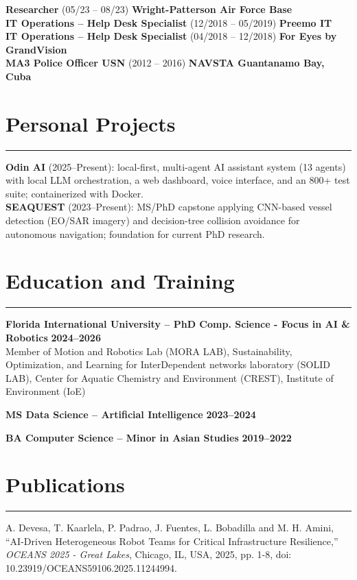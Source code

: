 \documentclass[10pt,letterpaper]{article}
\newcommand{\sectionrule}{\vspace{-2pt}\hrule\vspace{4pt}}
\begin{document}
\vspace{2pt}
\textbf{Researcher} (05/23 -- 08/23) \hfill \textbf{Wright-Patterson Air Force Base}\\
\textbf{IT Operations -- Help Desk Specialist} (12/2018 -- 05/2019) \hfill \textbf{Preemo IT}\\
\textbf{IT Operations -- Help Desk Specialist} (04/2018 -- 12/2018) \hfill \textbf{For Eyes by GrandVision}\\
\textbf{MA3 Police Officer USN} (2012 -- 2016) \hfill \textbf{NAVSTA Guantanamo Bay, Cuba}

\section{Personal Projects}
\sectionrule
\fontsize{9}{11}\selectfont
\textbf{Odin AI} (2025--Present): local-first, multi-agent AI assistant system (13 agents) with local LLM
orchestration, a web dashboard, voice interface, and an 800+ test suite; containerized with Docker.\\[2pt]
\textbf{SEAQUEST} (2023--Present): MS/PhD capstone applying CNN-based vessel detection (EO/SAR imagery) and
decision-tree collision avoidance for autonomous navigation; foundation for current PhD research.

\section{Education and Training}
\sectionrule
\fontsize{9}{11}\selectfont
\begin{tightlist}
\item \textbf{Florida International University -- PhD Comp. Science - Focus in AI \& Robotics} \hfill \textbf{2024--2026}\\[2pt]
\hspace{14pt}Member of Motion and Robotics Lab (MORA LAB), Sustainability, Optimization, and Learning for
InterDependent networks laboratory (SOLID LAB), Center for Aquatic Chemistry and Environment (CREST),
Institute of Environment (IoE)
\item \textbf{MS Data Science -- Artificial Intelligence} \hfill \textbf{2023--2024}
\item \textbf{BA Computer Science -- Minor in Asian Studies} \hfill \textbf{2019--2022}
\end{tightlist}


\section{Publications}
\sectionrule
\fontsize{9}{11}\selectfont
\vspace{2pt}
\noindent A. Devesa, T. Kaarlela, P. Padrao, J. Fuentes, L. Bobadilla and M. H. Amini, ``AI-Driven
Heterogeneous Robot Teams for Critical Infrastructure Resilience,'' \textit{OCEANS 2025 - Great Lakes},
Chicago, IL, USA, 2025, pp. 1-8, doi: 10.23919/OCEANS59106.2025.11244994.
\end{document}
